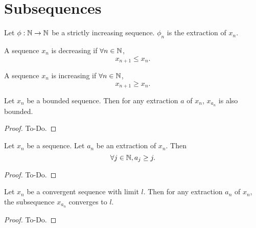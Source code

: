 \chapter{Subsequences}\label{cha:subsequences}

\begin{definition}[Extraction]\label{def:extraction}
     \leanok
    Let $\phi : \mathbb{N} \to \mathbb{N}$ be a strictly increasing sequence.
    $\phi_n$ is the extraction of $x_n$.
\end{definition}

\begin{definition}\label{def:seqdec}
     \leanok
    A sequence $x_n$ is decreasing if $\forall n \in \mathbb{N}$,
    \[
    x_{n + 1} \leq x_n.
    \]
\end{definition}

\begin{definition}\label{def:seqinc}
    A sequence $x_n$ is increasing if $\forall n \in \mathbb{N}$,
    \[
    x_{n + 1} \geq x_n.
    \]
\end{definition}

\begin{lemma}\label{lem:seqboundsubseqbound}
     \leanok
    Let $x_n$ be a bounded sequence.
    Then for any extraction $a$ of $x_n$,
    $x_{a_n}$ is also bounded.
\end{lemma}
\begin{proof}
    To-Do.
\end{proof}

\begin{lemma}\label{lem:subseq_ge_indx}
     \leanok
    Let $x_n$ be a sequence.
    Let $a_n$ be an extraction of $x_n$.
    Then
    \[
    \forall j \in \mathbb{N}, a_j \geq j.
    \]
\end{lemma}
\begin{proof}
    To-Do.
\end{proof}

\begin{lemma}\label{lem:subseqconvtoseqlim}
     \leanok
    Let $x_n$ be a convergent sequence with limit $l$.
    Then for any extraction $a_n$ of $x_n$,
    the subsequence $x_{a_n}$ converges to $l$. 
\end{lemma}
\begin{proof}
    To-Do.
\end{proof}

